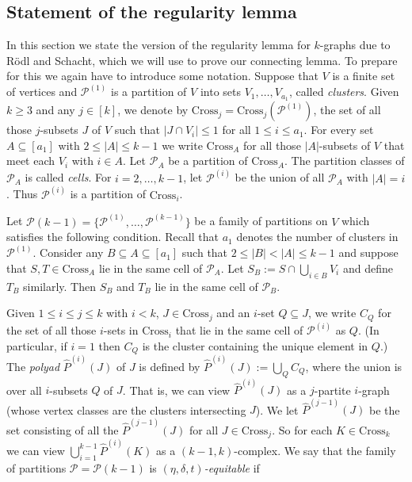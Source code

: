 \documentclass[11pt, reqno]{amsart}    	%
\theoremstyle{definition}
\numberwithin{equation}{section}
\begin{document}
	
	
	\subsection{Statement of the regularity lemma}
	In this section we state the version of the regularity lemma for $k$-graphs due to R\"{o}dl and Schacht, which we will use to prove our connecting lemma. To prepare for this we again have to introduce some notation. Suppose that $V$ is a finite set of vertices and $\mathcal{P}^{(1)}$ is a partition of $V$ into sets $V_1, \dots , V_{a_1}$, called \emph{clusters}. Given $k \geq 3$ and any $j \in [k]$, we denote by $\text{Cross}_j = \text{Cross}_j (\mathcal{P}^{(1)})$, the set of all those $j$-subsets $J$ of $V$ such that $|J\cap V_i| \leq 1$ for all $1\leq i \leq a_1$. For every set $A \subseteq [a_1]$ with $2 \leq |A| \leq k-1$ we write $\text{Cross}_A$ for all those $|A|$-subsets of $V$ that meet each $V_i$ with $i \in A$. Let $\mathcal{P}_A$ be a partition of $\text{Cross}_A$. The partition classes of $\mathcal{P}_A$ is called \emph{cells}. For $i = 2, \dots , k-1$, let $\mathcal{P}^{(i)}$ be the union of all $\mathcal{P}_A$ with $|A| = i$. Thus $\mathcal{P}^{(i)}$ is a partition of $\text{Cross}_i$.
	
	Let $\mathcal{P}(k-1) = \{\mathcal{P}^{(1)}, \dots ,\mathcal{P}^{(k-1)}\}$ be a family of partitions on $V$ which satisfies the following condition. Recall that $a_1$ denotes the number of clusters in $\mathcal{P}^{(1)}$. Consider any $B \subseteq A \subseteq [a_1]$ such that $2 \leq |B| < |A| \leq k-1$ and suppose that $S, T \in \text{Cross}_A $ lie in the same cell of $\mathcal{P}_{A}$. Let $S_B := S \cap \bigcup_{i\in B} V_i$ and define $T_B$ similarly. Then $S_B$ and $T_B$ lie in the same cell of $\mathcal{P}_{B}$.
	
	Given $1 \leq i \leq j \leq k$ with $i < k$, $J \in \text{Cross}_j$ and an $i$-set $Q \subseteq J$, we write $C_Q$ for the set of all those $i$-sets in $\text{Cross}_i$ that lie in the same cell of $\mathcal{P}^{(i)}$ as $Q$. (In particular, if $i = 1$ then $C_Q$ is the cluster containing the unique element in $Q$.) The \emph{polyad} $\hat{P}^{(i)}(J)$ of $J$ is defined by $\hat{P}^{(i)}(J):=\bigcup_Q C_Q$, where the union is over all $i$-subsets $Q$ of $J$. That is, we can view $\hat{P}^{(i)}(J)$ as a $j$-partite $i$-graph (whose vertex classes are the clusters intersecting $J$). We let $\hat{P}^{(j-1)}(J)$ be the set consisting of all the $\hat{P}^{(j-1)}(J)$ for all $J\in \mathrm{Cross}_j$. So for each $K \in \text{Cross}_k$ we can view $\bigcup^{k-1}_{i=1}\hat{P}^{(i)}(K)$ as a $(k-1, k)$-complex.
	We say that the family of partitions $\mathcal{P}=\mathcal{P}(k-1)$ is \emph{$(\eta, \delta, t)$-equitable} if\vspace{3mm}
	
\end{document}

